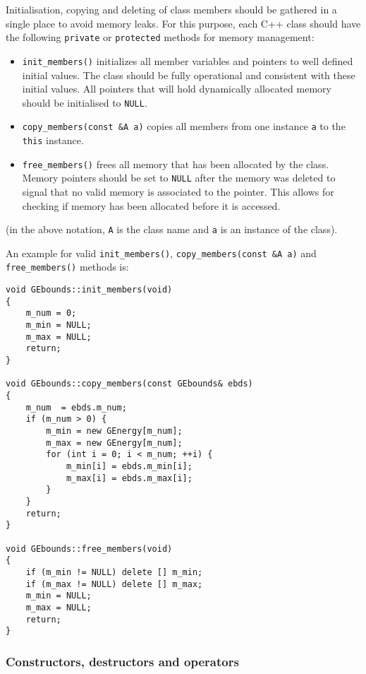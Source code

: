 \documentclass{article}[12pt,a4]
\begin{document}
Initialisation, copying and deleting of class members should be gathered in a single
place to avoid memory leaks.
For this purpose, each C++ class should have the following {\tt private} or {\tt protected}
methods for memory management:
\begin{itemize}
\item {\tt init\_members()} initializes all member variables and pointers to well defined
initial values. The class should be fully operational and consistent with these initial
values. All pointers that will hold dynamically allocated memory should be
initialised to {\tt NULL}.
\item {\tt copy\_members(const \&A a)} copies all members from one instance {\tt a}
to the {\tt this} instance.
\item {\tt free\_members()} frees all memory that has been allocated by the class.
Memory pointers should be set to {\tt NULL} after the memory was deleted to signal
that no valid memory is associated to the pointer.
This allows for checking if memory has been allocated before it is accessed.
\end{itemize}
(in the above notation, {\tt A} is the class name and {\tt a} is an instance of the class).

An example for valid {\tt init\_members()}, {\tt copy\_members(const \&A a)} and
{\tt free\_members()} methods is:
\begin{verbatim}
void GEbounds::init_members(void)
{
    m_num = 0;
    m_min = NULL;
    m_max = NULL;
    return;
}

void GEbounds::copy_members(const GEbounds& ebds)
{
    m_num  = ebds.m_num;
    if (m_num > 0) {
        m_min = new GEnergy[m_num];
        m_max = new GEnergy[m_num];
        for (int i = 0; i < m_num; ++i) {
            m_min[i] = ebds.m_min[i];
            m_max[i] = ebds.m_max[i];
        }
    }
    return;
}

void GEbounds::free_members(void)
{
    if (m_min != NULL) delete [] m_min;
    if (m_max != NULL) delete [] m_max;
    m_min = NULL;
    m_max = NULL;
    return;
}
\end{verbatim}


\subsubsection{Constructors, destructors and operators}
\end{document}

